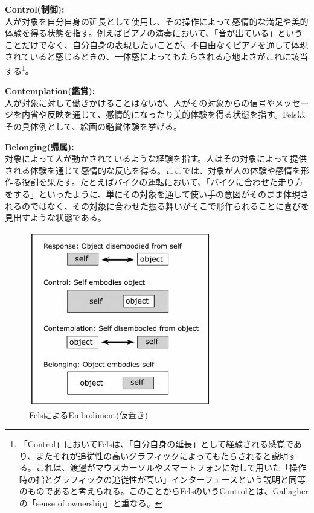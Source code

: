 \textbf{Control(制御):}\\
人が対象を自分自身の延長として使用し、その操作によって感情的な満足や美的体験を得る状態を指す。例えばピアノの演奏において、「音が出ている」ということだけでなく、自分自身の表現したいことが、不自由なくピアノを通して体現されていると感じるときの、一体感によってもたらされる心地よさがこれに該当する\footnote{「Control」においてFelsは、「自分自身の延長」として経験される感覚であり、またそれが追従性の高いグラフィックによってもたらされると説明する。これは、渡邊がマウスカーソルやスマートフォンに対して用いた「操作時の指とグラフィックの追従性が高い」インターフェースという説明と同等のものであると考えられる。このことからFelsのいうControlとは、Gallagherの「sense of ownership」と重なる。}。

\textbf{Contemplation(鑑賞):}\\
人が対象に対して働きかけることはないが、人がその対象からの信号やメッセージを内省や反映を通じて、感情的になったり美的体験を得る状態を指す。Felsはその具体例として、絵画の鑑賞体験を挙げる。

\textbf{Belonging(帰属):}\\
対象によって人が動かされているような経験を指す。人はその対象によって提供される体験を通じて感情的な反応を得る。ここでは、対象が人の体験や感情を形作る役割を果たす。たとえばバイクの運転において、「バイクに合わせた走り方をする」といったように、単にその対象を通して使い手の意図がそのまま体現されるのではなく、その対象に合わせた振る舞いがそこで形作られることに喜びを見出すような状態である。

\begin{figure}[H]
  \centering
  \includegraphics[width=8cm]{img/fels_diagram.png}
  \caption{FelsによるEmbodiment(仮置き)}
  \label{fig:fels_embodiment}
\end{figure}

